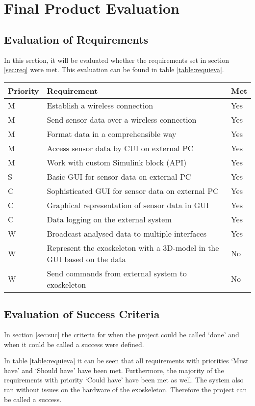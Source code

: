 \chapter{Final Product Evaluation}
\label{ch:eval}
\section{Evaluation of Requirements}
In this section, it will be evaluated whether the requirements set in section \ref{sec:req} were met. This evaluation can be found in table \ref{table:requieva}.\\

{\renewcommand{\arraystretch}{1.5}
	\centering
	\begin{tabular}{ | l | l || l || }
		\hline
		\bfseries{Priority} & \bfseries{Requirement} & \bfseries{Met} \\ \hline
		M & Establish a wireless connection & Yes \\ \hline
		M & Send sensor data over a wireless connection & Yes \\ \hline
		M & Format data in a comprehensible way & Yes \\ \hline
		M & Access sensor data by CUI on external PC & Yes \\ \hline
		M & Work with custom Simulink block (API) & Yes \\ \hline
		S & Basic GUI for sensor data on external PC & Yes \\ \hline
		C & Sophisticated GUI for sensor data on external PC & Yes \\ \hline
		C & Graphical representation of sensor data in GUI & Yes \\ \hline
		C & Data logging on the external system & Yes \\ \hline
		W & Broadcast analysed data to multiple interfaces & Yes \\ \hline
		W & Represent the exoskeleton with a 3D-model in the GUI based on the data & No \\ \hline
		W & Send commands from external system to exoskeleton & No \\ \hline 
	\end{tabular}
	\label{table:requieva}
}

\section{Evaluation of Success Criteria} \label{sec:evasuc}
In section \ref{sec:suc} the criteria for when the project could be called `done' and when it could be called a success were defined.

In table \ref{table:requieva} it can be seen that all requirements with priorities `Must have' and `Should have' have been met. Furthermore, the majority of the requirements with priority `Could have' have been met as well. The system also ran without issues on the hardware of the exoskeleton. Therefore the project can be called a success.